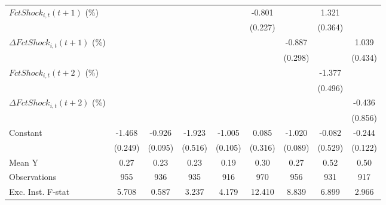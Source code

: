 {\begin{tabular}{l*{8}{c}}
\addlinespace
$ FctShock_{i,t}(t+1)$ (\%)&                     &                     &                     &                     &      -0.801\sym{***}&                     &       1.321\sym{***}&                     \\
                    &                     &                     &                     &                     &     (0.227)         &                     &     (0.364)         &                     \\
\addlinespace
$ \Delta FctShock_{i,t}(t+1)$ (\%)&                     &                     &                     &                     &                     &      -0.887\sym{***}&                     &       1.039\sym{**} \\
                    &                     &                     &                     &                     &                     &     (0.298)         &                     &     (0.434)         \\
\addlinespace
$ FctShock_{i,t}(t+2)$ (\%)&                     &                     &                     &                     &                     &                     &      -1.377\sym{***}&                     \\
                    &                     &                     &                     &                     &                     &                     &     (0.496)         &                     \\
\addlinespace
$ \Delta FctShock_{i,t}(t+2)$ (\%)&                     &                     &                     &                     &                     &                     &                     &      -0.436         \\
                    &                     &                     &                     &                     &                     &                     &                     &     (0.856)         \\
\addlinespace
Constant            &      -1.468\sym{***}&      -0.926\sym{***}&      -1.923\sym{***}&      -1.005\sym{***}&       0.085         &      -1.020\sym{***}&      -0.082         &      -0.244\sym{*}  \\
                    &     (0.249)         &     (0.095)         &     (0.516)         &     (0.105)         &     (0.316)         &     (0.089)         &     (0.529)         &     (0.122)         \\
\midrule
Mean Y              &        0.27         &        0.23         &        0.23         &        0.19         &        0.30         &        0.27         &        0.52         &        0.50         \\
Observations        &         955         &         936         &         935         &         916         &         970         &         956         &         931         &         917         \\
Exc. Inst. F-stat   &       5.708         &       0.587         &       3.237         &       4.179         &      12.410         &       8.839         &       6.899         &       2.966         \\
\bottomrule
\end{tabular}
}
